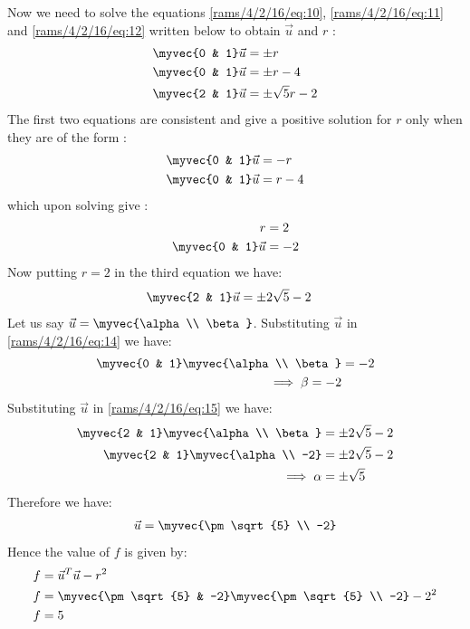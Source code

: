 Now we need to solve the equations \eqref{rams/4/2/16/eq:10}, \eqref{rams/4/2/16/eq:11} and \eqref{rams/4/2/16/eq:12} written below to obtain $\vec{u}$ and $r$ :
\begin{align}
\myvec{0 & 1}\vec{u} &= \pm{r}\nonumber\\
\myvec{0 & 1}\vec{u} &= \pm{r}-4\nonumber\\
\myvec{2 & 1}\vec{u} &= \pm\sqrt{5}r-2\nonumber
\end{align}
The first two equations are consistent and give a positive solution for $r$ only when they are of the form :
\begin{align}
\myvec{0 & 1}\vec{u} &= -r\nonumber\\
\myvec{0 & 1}\vec{u} &= r-4\nonumber
\end{align}
which upon solving give :
\begin{align}
r &= 2\label{rams/4/2/16/eq:13}\\
\myvec{0 & 1}\vec{u} &= -2\label{rams/4/2/16/eq:14}
\end{align}
Now putting $r=2$ in the third equation we have:
\begin{align}
\myvec{2 & 1}\vec{u} &= \pm2\sqrt{5}-2\label{rams/4/2/16/eq:15}
\end{align}
Let us say $\vec{u} = \myvec{\alpha \\ \beta}$. Substituting $\vec{u}$ in \eqref{rams/4/2/16/eq:14} we have:
\begin{align}
\myvec{0 & 1}\myvec{\alpha \\ \beta} &= -2\\
\implies \beta = -2
\end{align}
Substituting $\vec{u}$ in \eqref{rams/4/2/16/eq:15} we have:
\begin{align}
\myvec{2 & 1}\myvec{\alpha \\ \beta} &= \pm2\sqrt{5} -2\\
\myvec{2 & 1}\myvec{\alpha \\ -2} &= \pm2\sqrt{5} -2\\
\implies \alpha &= \pm\sqrt{5}
\end{align}
Therefore we have:
\begin{align}
\vec{u} = \myvec{\pm\sqrt{5} \\ -2}
\end{align}
Hence the value of $f$ is given by:
\begin{align}
f &=\vec{u}^T\vec{u}-r^2\\
f &= \myvec{\pm\sqrt{5} & -2}\myvec{\pm\sqrt{5} \\ -2} - 2^2\\
f &= 5
\end{align}
